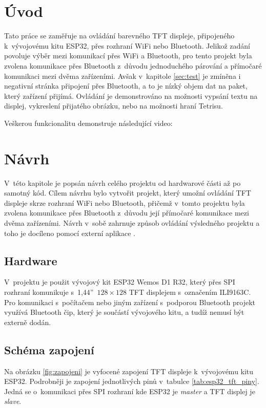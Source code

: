 \chapter{Úvod}

Tato práce se zaměřuje na ovládání barevného TFT displeje, připojeného k~vývojovému kitu ESP32, přes rozhraní WiFi nebo Bluetooth. Jelikož zadání povoluje výběr mezi komunikací přes WiFi a Bluetooth, pro tento projekt byla zvolena komunikace přes Bluetooth z~důvodu jednoduchého párování a přímočaré komunikaci mezi dvěma zařízeními. Avšak v~kapitole \ref{sec:test} je zmíněna i negativní stránka připojení přes Bluetooth, a to je nízký objem dat na paket, který zařízení přijímá. Ovládání je demonstrováno na možnosti vypsání textu na displej, vykreslení přijatého obrázku, nebo na možnosti hraní Tetrisu.

Veškerou funkcionalitu demonstruje následující video: \url{}

\chapter{Návrh}

V~této kapitole je popsán návrh celého projektu od hardwarové části až po samotný kód. Cílem návrhu bylo vytvořit projekt, který umožní ovládání TFT displeje skrze rozhraní WiFi nebo Bluetooth, přičemž v~tomto projektu byla zvolena komunikace přes Bluetooth z~důvodu její přímočaré komunikace mezi dvěma zařízeními. Návrh v~sobě zahrnuje způsob ovládání výsledného projektu a toho je docíleno pomocí externí aplikace \cite{AppPixelBluetoothCanvas}.

\section{Hardware}

V~projektu je použit vývojový kit ESP32 Wemos D1 R32, který přes SPI rozhraní komunikuje s~1,44''~$128\times128$ TFT displejem s~označením ILI9163C.
Pro komunikaci s~počítačem nebo jiným zařízení s~podporou Bluetooth projekt využívá Bluetooth čip, který je součástí vývojového kitu, a tudíž nemusí být externě dodán.

\section{Schéma zapojení}

Na obrázku \ref{fig:zapojeni} je vyfocené zapojení TFT displeje k~vývojovému kitu ESP32. Podrobněji je zapojení jednotlivých pinů v~tabulce \ref{tab:esp32_tft_piny}. Jedná se o~komunikaci přes SPI rozhraní kde ESP32 je \textit{master} a TFT displej je \textit{slave}.

